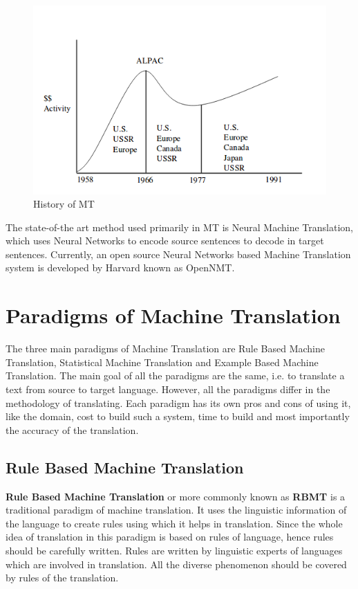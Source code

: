     \begin{figure}
        \centering
        \includegraphics[scale=0.6]{Images/mtHistory.png}
        \caption{History of MT}
        \label{fig:history}
    \end{figure}
    The state-of-the art method used primarily in MT is Neural Machine Translation, which uses Neural Networks to encode source sentences to decode in target sentences. Currently, an open source Neural Networks based Machine Translation system is developed by Harvard known as OpenNMT\cite{openNMT}.
        
\section{Paradigms of Machine Translation}
    The three main paradigms of Machine Translation are Rule Based Machine Translation, Statistical Machine Translation and Example Based Machine Translation. The main goal of all the paradigms are the same, i.e. to translate a text from source to target language. However, all the paradigms differ in the methodology of translating. Each paradigm has its own pros and cons of using it, like the domain, cost to build such a system, time to build and most importantly the accuracy of the translation.
    
    \subsection{Rule Based Machine Translation}
    \textbf{Rule Based Machine Translation} or more commonly known as \textbf{RBMT} is a traditional paradigm of machine translation. It uses the linguistic information of the language to create rules using which it helps in translation. Since the whole idea of translation in this paradigm is based on rules of language, hence rules should be carefully written. Rules are written by linguistic experts of languages which are involved in translation. All the diverse phenomenon should be covered by rules of the translation. 
    
